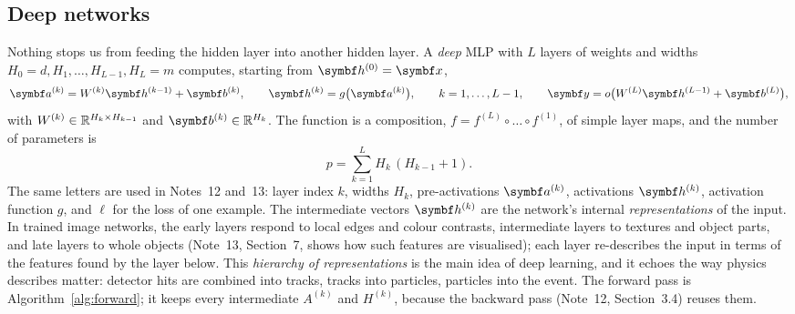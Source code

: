 \documentclass[11pt]{article}
\newcommand{\hv}{\vect{h}}
\newcommand{\y}{\vect{y}}
\newcommand{\va}{\vect{a}}
\newcommand{\vb}{\vect{b}}
\begin{document}
\subsection{Deep networks}\label{sec:deep}

Nothing stops us from feeding the hidden layer into another hidden layer. A \emph{deep} MLP with $L$ layers of weights
and widths $H_0 = d, H_1, \dots, H_{L-1}, H_L = m$ computes, starting from $\hv^{(0)} = \x$,
\begin{equation}\label{eq:deep}
  \va^{(k)} = W^{(k)}\hv^{(k - 1)} + \vb^{(k)}, \qquad \hv^{(k)} = g\big(\va^{(k)}\big), \qquad k = 1, \dots, L - 1,
  \qquad \y = o\big(W^{(L)}\hv^{(L - 1)} + \vb^{(L)}\big),
\end{equation}
with $W^{(k)} \in \mathbb{R}^{H_k \times H_{k - 1}}$ and $\vb^{(k)} \in \R^{H_k}$. The function is a composition,
$f = f^{(L)} \circ \dots \circ f^{(1)}$, of simple layer maps, and the number of parameters is
\begin{equation}\label{eq:count}
  p = \sum_{k = 1}^{L} H_k\,(H_{k - 1} + 1) .
\end{equation}
The same letters are used in Notes~12 and~13: layer index $k$, widths $H_k$, pre-activations $\va^{(k)}$, activations
$\hv^{(k)}$, activation function $g$, and $\ell$ for the loss of one example. The intermediate vectors $\hv^{(k)}$ are the network's internal \emph{representations} of the input. In trained
image networks, the early layers respond to local edges and colour contrasts, intermediate layers to textures and
object parts, and late layers to whole objects (Note~13, Section~7, shows how such features are visualised); each layer re-describes the input in terms of the features found by the
layer below. This \emph{hierarchy of representations} is the main idea of deep learning, and it echoes the way physics
describes matter: detector hits are combined into tracks, tracks into particles, particles into the event. The
forward pass is Algorithm~\ref{alg:forward}; it keeps every intermediate $A^{(k)}$ and $H^{(k)}$, because the
backward pass (Note~12, Section~3.4) reuses them.
\end{document}
